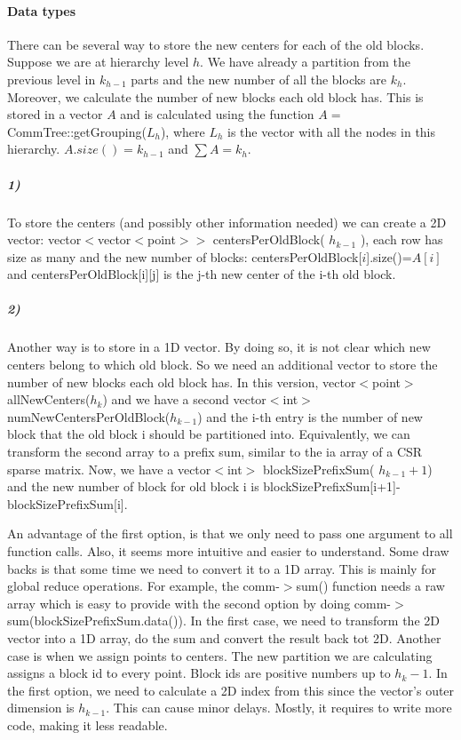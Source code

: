 \documentclass[a4paper,10pt]{article}
\begin{document}
\paragraph{Data types} There can be several way to store the new centers for each of the old
blocks. Suppose we are at hierarchy level $h$. We have already a partition from the previous 
level in $k_{h-1}$ parts and the new number of all the blocks are $k_h$. Moreover, we calculate
the number of new blocks each old block has. This is stored in a vector $A$ and is calculated
using the function $A=$CommTree::getGrouping($L_h$), where $L_h$ is the vector with all the nodes
in this hierarchy. $A.size()=k_{h-1}$ and $\sum A= k_h$.

\subparagraph*{1)} To store the centers (and possibly other information needed) we can create a 2D vector:
vector$<$vector$<$point$>>$ centersPerOldBlock( $h_{k-1}$ ), each row has size as many and the 
new number of blocks: centersPerOldBlock[$i$].size()=$A[i]$ and centersPerOldBlock[i][j] is the 
j-th new center of the i-th old block. 

\subparagraph*{2)} Another way is to store in a 1D vector. By doing so, it is not clear which new 
centers belong to which old block. So we need an additional vector to store the number of new blocks
each old block has. In this version, vector$<$point$>$ allNewCenters($h_k$) and we have a second
vector$<$int$>$ numNewCentersPerOldBlock($h_{k-1}$) and the i-th entry is the number of new
block that the old block i should be partitioned into. Equivalently, we can transform the second
array to a prefix sum, similar to the ia array of a CSR sparse matrix. Now, we have a 
vector$<$int$>$ blockSizePrefixSum( $h_{k-1}+1$) and the new number of block for old block i
is blockSizePrefixSum[i+1]-blockSizePrefixSum[i].

An advantage of the first option, is that we only need to pass one argument to all function calls.
Also, it seems more intuitive and easier to understand. Some draw backs is that some time we 
need to convert it to a 1D array. This is mainly for global reduce operations. For example,
the comm-$>$sum() function needs a raw array which is easy to provide with the second option
by doing comm-$>$sum(blockSizePrefixSum.data()). In the first case, we need to transform the
2D vector into a 1D array, do the sum and convert the result back tot 2D.
Another case is when we assign points to centers. The new partition we are calculating assigns
a block id to every point. Block ids are positive numbers up to $h_k-1$. In the first option,
we need to calculate a 2D index from this since the vector's outer dimension is $h_{k-1}$.
This can cause minor delays. Mostly, it requires to write more code, making it less readable.
\end{document}
